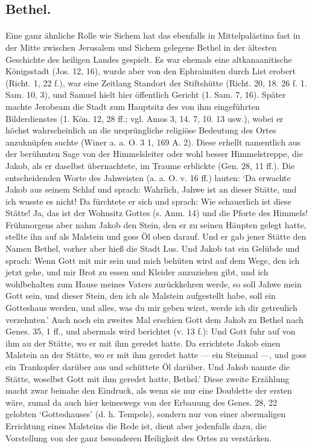 \documentclass[a4paper, 11pt, oneside]{article}
\begin{document}
\subsection{Bethel.}
\paragraph{}
Eine ganz ähnliche Rolle wie Sichem hat das ebenfalls in Mittelpalästina fast in der Mitte zwischen Jerusalem und Sichem gelegene Bethel in der ältesten Geschichte des heiligen Landes gespielt. Es war ehemals eine altkanaanitische Königsstadt (Jos. 12, 16), wurde aber von den Ephraimiten durch List erobert (Richt. 1, 22 f.), war eine Zeitlang Standort der Stiftshütte (Richt. 20, 18. 26 f. 1. Sam. 10, 3), und Samuel hielt hier öffentlich Gericht (1. Sam. 7, 16). Später machte Jerobeam die Stadt zum Hauptsitz des von ihm eingeführten Bilderdienstes (1. Kön. 12, 28 ff.; vgl. Amos 3, 14. 7, 10. 13 usw.), wobei er höchst wahrscheinlich an die ursprüngliche religiöse Bedeutung des Ortes anzuknüpfen suchte (Winer a. a. O. 3 1, 169 A. 2). Diese erhellt namentlich aus der berühmten Sage von der Himmelsleiter oder wohl besser Himmelstreppe, die Jakob, als er daselbst übernachtete, im Traume erblickte (Gen. 28, 11 ff.). Die entscheidenden Worte des Jahweisten (a. a. O. v. 16 ff.) lauten: `Da erwachte Jakob aus seinem Schlaf und sprach: Wahrlich, Jahwe ist an dieser Stätte, und ich wusste es nicht! Da fürchtete er sich und sprach: Wie schauerlich ist diese Stätte! Ja, das ist der Wohnsitz Gottes (s. Anm. 14) und die Pforte des Himmels! Frühmorgens aber nahm Jakob den Stein, den er zu seinen Häupten gelegt hatte, stellte ihn auf als Malstein und goss Öl oben darauf. Und er gab jener Stätte den Namen Bethel, vorher aber hieß die Stadt Lus. Und Jakob tat ein Gelübde und sprach: Wenn Gott mit mir sein und mich behüten wird auf dem Wege, den ich jetzt gehe, und mir Brot zu essen und Kleider anzuziehen gibt, und ich wohlbehalten zum Hause meines Vaters zurückkehren werde, so soll Jahwe mein Gott sein, und dieser Stein, den ich als Malstein aufgestellt habe, soll ein Gotteshaus werden, und alles, was du mir geben wirst, werde ich dir getreulich verzehnten.' Auch noch ein zweites Mal erschien Gott dem Jakob zu Bethel nach Genes. 35, 1 ff., und abermals wird berichtet (v. 13 f.): Und Gott fuhr auf von ihm au der Stätte, wo er mit ihm geredet hatte. Da errichtete Jakob einen Malstein an der Stätte, wo er mit ihm geredet hatte --- ein Steinmal ---, und goss ein Trankopfer darüber aus und schüttete Öl darüber. Und Jakob nannte die Stätte, woselbst Gott mit ihm geredet hatte, Bethel.' Diese zweite Erzählung macht zwar beinahe den Eindruck, als wenn sie nur eine Doublette der ersten wäre, zumal da auch hier keineswegs von der Erbauung des Genes. 28, 22 gelobten `Gotteshauses' (d. h. Tempels), sondern nur von einer abermaligen Errichtung eines Malsteins die Rede ist, dient aber jedenfalls dazu, die Vorstellung von der ganz besonderen Heiligkeit des Ortes zu verstärken.
\end{document}

